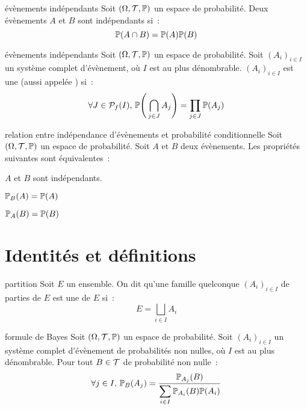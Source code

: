 \begin{definition}{}{évènements indépendants}
    Soit $(\Omega, \mathcal{T}, \mathbb{P})$ un espace de probabilité. Deux évènements $A$ et $B$ sont indépendants si~:
    $$\mathbb{P}(A \cap B) = \mathbb{P}(A) \mathbb{P}(B)$$
\end{definition}

\begin{definition}{15.37}{évènements indépendants}
    Soit $(\Omega, \mathcal{T}, \mathbb{P})$ un espace de probabilité. Soit $(A_i)_{i \in I}$ un système complet d'évènement, où $I$ est au plus dénombrable. $(A_i)_{i \in I}$ est une  (aussi appelée ) si~:
    $$\forall J \in \mathcal{P}_f(I),\, \mathbb{P}\Bigg(\bigcap_{j \in J} A_j\Bigg) = \prod_{j \in J}\mathbb{P}(A_j)$$
\end{definition}

\begin{proposition}{}{relation entre indépendance d'évènements et probabilité conditionnelle}
    Soit $(\Omega, \mathcal{T}, \mathbb{P})$ un espace de probabilité. Soit $A$ et $B$ deux évènements. Les propriétés suivantes sont équivalentes~:
    \begin{enumeratebf}
        \item $A$ et $B$ sont indépendants.
        \item $\mathbb{P}_B(A) = \mathbb{P}(A)$
        \item $\mathbb{P}_A(B) = \mathbb{P}(B)$
    \end{enumeratebf}
    
\end{proposition}

\section{Identités et définitions}

\begin{definition}{}{partition}
    Soit $E$ un ensemble. On dit qu'une famille quelconque $(A_i)_{i\in I}$ de parties de $E$ est une  de $E$ si~:
    $$E = \bigsqcup_{i \in I}A_i$$
\end{definition}

\begin{theoreme}{}{formule de Bayes}
    Soit $(\Omega, \mathcal{T}, \mathbb{P})$ un espace de probabilité. Soit $(A_i)_{i \in I}$ un système complet d'évènement de probabilités non nulles, où $I$ est au plus dénombrable. Pour tout $B \in \mathcal{T}$ de probabilité non nulle~: 
    $$\forall j \in I,\, \mathbb{P}_B(A_j) = \frac{\mathbb{P}_{A_j}(B)}{\displaystyle \sum_{i \in I} \mathbb{P}_{A_i}(B)\mathbb{P}(A_i)}$$
\end{theoreme}

